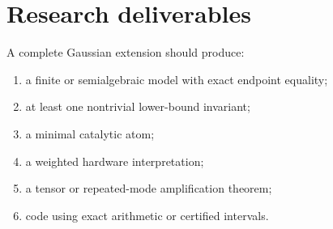 \section{Research deliverables}
A complete Gaussian extension should produce:
\begin{enumerate}
\item a finite or semialgebraic model with exact endpoint equality;
\item at least one nontrivial lower-bound invariant;
\item a minimal catalytic atom;
\item a weighted hardware interpretation;
\item a tensor or repeated-mode amplification theorem;
\item code using exact arithmetic or certified intervals.
\end{enumerate}

